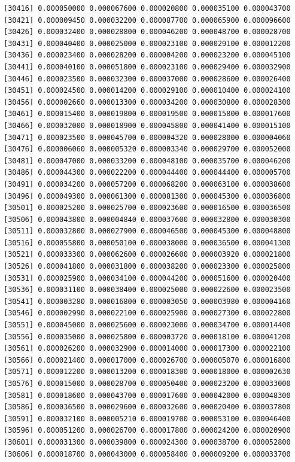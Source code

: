 \documentclass[]{article}
\begin{document}
\begin{verbatim}
[30416] 0.000050000 0.000067600 0.000020800 0.000035100 0.000043700
[30421] 0.000009450 0.000032200 0.000087700 0.000065900 0.000096600
[30426] 0.000032400 0.000028800 0.000046200 0.000048700 0.000028700
[30431] 0.000040400 0.000025000 0.000023100 0.000029100 0.000012200
[30436] 0.000023400 0.000028200 0.000004200 0.000023200 0.000045100
[30441] 0.000040100 0.000051800 0.000023100 0.000029400 0.000032900
[30446] 0.000023500 0.000032300 0.000037000 0.000028600 0.000026400
[30451] 0.000024500 0.000014200 0.000029100 0.000010400 0.000024100
[30456] 0.000002660 0.000013300 0.000034200 0.000030800 0.000028300
[30461] 0.000015400 0.000019800 0.000019500 0.000015800 0.000017600
[30466] 0.000032000 0.000018900 0.000045800 0.000041400 0.000015100
[30471] 0.000023500 0.000045700 0.000004320 0.000028000 0.000004060
[30476] 0.000006060 0.000005320 0.000003340 0.000029700 0.000052000
[30481] 0.000047000 0.000033200 0.000048100 0.000035700 0.000046200
[30486] 0.000044300 0.000022200 0.000044400 0.000044400 0.000005700
[30491] 0.000034200 0.000057200 0.000068200 0.000063100 0.000038600
[30496] 0.000049300 0.000061300 0.000081300 0.000045300 0.000036800
[30501] 0.000025200 0.000025700 0.000023600 0.000016500 0.000036500
[30506] 0.000043800 0.000004840 0.000037600 0.000032800 0.000030300
[30511] 0.000032800 0.000027900 0.000046500 0.000045300 0.000048800
[30516] 0.000055800 0.000050100 0.000038000 0.000036500 0.000041300
[30521] 0.000033300 0.000062600 0.000026600 0.000003920 0.000021800
[30526] 0.000041800 0.000031800 0.000038200 0.000023300 0.000025800
[30531] 0.000025900 0.000034100 0.000044200 0.000051600 0.000020400
[30536] 0.000031100 0.000038400 0.000025000 0.000022600 0.000023500
[30541] 0.000003280 0.000016800 0.000003050 0.000003980 0.000004160
[30546] 0.000002990 0.000022100 0.000025900 0.000027300 0.000022800
[30551] 0.000045000 0.000025600 0.000023000 0.000034700 0.000014400
[30556] 0.000035000 0.000025800 0.000003720 0.000018100 0.000041200
[30561] 0.000026200 0.000032900 0.000014000 0.000017300 0.000022100
[30566] 0.000021400 0.000017000 0.000026700 0.000005070 0.000016800
[30571] 0.000012200 0.000013200 0.000018300 0.000018000 0.000002630
[30576] 0.000015000 0.000028700 0.000050400 0.000023200 0.000033000
[30581] 0.000018600 0.000043700 0.000017600 0.000042000 0.000048300
[30586] 0.000036500 0.000029600 0.000032600 0.000020400 0.000037800
[30591] 0.000032100 0.000005210 0.000019700 0.000053100 0.000046400
[30596] 0.000051200 0.000026700 0.000017800 0.000024200 0.000020900
[30601] 0.000031300 0.000039800 0.000024300 0.000038700 0.000052800
[30606] 0.000018700 0.000043000 0.000058400 0.000009200 0.000033700

\end{verbatim}
\end{document}
